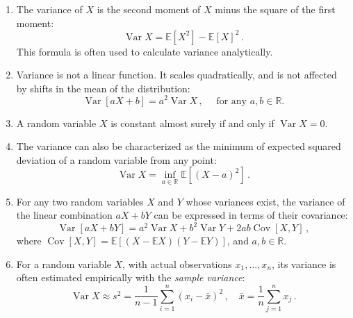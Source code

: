 \documentclass{article}
\newcommand{\real}{\mathbb{R}}
\newcommand{\E}{\mathbb{E}}
\DeclareMathOperator{\Var}{Var}
\DeclareMathOperator{\Cov}{Cov}
\begin{document}
\begin{enumerate}
\item
The variance of $X$ is the second moment of $X$ minus 
the square of the first moment:
\[
\Var X  = \E[X^2] - \E[X]^2\,.
\]
This formula is often used to calculate variance analytically.

\item
Variance is not a linear function. It scales quadratically,
and is not affected by shifts in the mean of the distribution:
\[
\Var[ aX + b ] = a^2 \Var X\,, \quad \text{ for any $a, b \in \real$.}
\]

\item
A random variable $X$ is constant almost surely if and only
if $\Var X = 0$.

\item
The variance can also be characterized as
the minimum of expected squared deviation of a random variable from any point:
\[
\Var X = \inf_{a \in \real} \E[(X-a)^2]\,.
\]

\item
For any two random variables $X$ and $Y$ whose variances exist,
the variance of the linear combination $aX + bY$
can be expressed in terms of their covariance:
\[
\Var[aX+bY] = a^2 \Var X  + b^2 \Var Y  + 2ab \Cov[X,Y]\,,
\]
where $\Cov[X,Y] = \E[(X-\E X)(Y-\E Y)]$,
and $a, b \in \real$.

\item
For a random variable $X$, with actual observations $x_1, \dotsc, x_n$,
its variance is often estimated
empirically with the \emph{sample variance}:
\[
\Var X  \approx s^2 = \frac{1}{n-1} \sum_{i=1}^n (x_i - \bar{x})^2\,,
\quad
\bar{x} = \frac{1}{n} \sum_{j=1}^n x_j\,.
\]

\end{enumerate}
\end{document}
